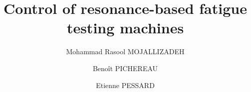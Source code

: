 \documentclass[preprint,12pt]{elsarticle}
\begin{document}
\begin{frontmatter}



\title{Control of resonance-based fatigue testing machines}


\author[1]{Mohammad Rasool MOJALLIZADEH}

\author[1]{Benoît PICHEREAU}

\author[1]{Etienne PESSARD}



\address[1]{Arts et Métiers Institute of Technology, LAMPA, F-49035 Angers, France}


\end{frontmatter}
\end{document}
